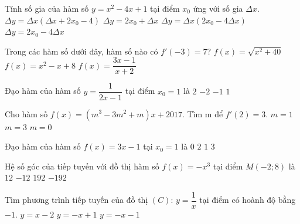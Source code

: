 \begin{ex}%
	Tính số gia của hàm số $y=x^2-4x+1$ tại điểm $x_0$ ứng với số gia $\Delta x$. 
	\choice
	{\True  $\Delta y=\Delta x\left( \Delta x+2x_0-4 \right)$}
	{$\Delta y=2x_0+\Delta x$}
	{$\Delta y=\Delta x\left( 2x_0-4\Delta x \right)$}
	{$\Delta y=2x_0-4\Delta x$} 
\end{ex}

\begin{ex}%
	Trong các hàm số dưới đây, hàm số nào có $f'(-3)=7$?
	{$f(x)=\sqrt{x^2+40}$}
	{$f(x)=x^2-x+8$}
	{\True $f(x)=\dfrac{3x-1}{x+2}$}
\end{ex}

\begin{ex}%
	Đạo hàm của hàm số $y=\dfrac{1}{2x-1}$ tại điểm $x_0=1$ là
	\choice
	{$2$}
	{\True $-2$}
	{$-1$}
	{$1$}
\end{ex}

\begin{ex}%
	Cho hàm số $f(x)=(m^3-3m^2+m)x+2017$. Tìm m để $f'(2)=3$.
	{ $m=1$}
	{\True $m=3$}
	{ $m=0$}
\end{ex}

\begin{ex}%
	Đạo hàm của hàm số $f(x)=3x-1$ tại $x_0=1$ là
	\choice
	{$0$}
	{$2$}
	{$1$}
	{\True $3$}
\end{ex}

\begin{ex}%
	Hệ số góc của tiếp tuyến với đồ thị hàm số $f(x)=-x^3$ tại điểm $M(-2; 8)$ là
	\choice
	{$12$}
	{\True $-12$}
	{$192$}
	{$-192$}
\end{ex}

\begin{ex}%
	Tìm phương trình tiếp tuyến của đồ thị $(C)$: $y=\dfrac{1}{x}$ tại điểm có hoành độ bằng $-1$.
	{$y=x-2$}
	{$y=-x+1$}
	{$y=-x-1$}
\end{ex}

